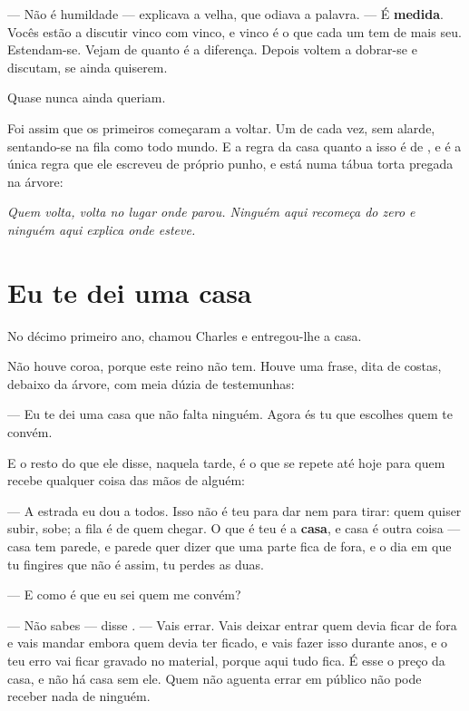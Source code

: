 \documentclass[livro.tex]{subfiles}
\begin{document}
--- Não é humildade --- explicava a velha, que odiava a palavra. --- É \textbf{medida}. Vocês
estão a discutir vinco com vinco, e vinco é o que cada um tem de mais seu. Estendam-se. Vejam de
quanto é a diferença. Depois voltem a dobrar-se e discutam, se ainda quiserem.

Quase nunca ainda queriam.

\medskip

Foi assim que os primeiros começaram a voltar. Um de cada vez, sem alarde, sentando-se na fila
como todo mundo. E a regra da casa quanto a isso é de \Ven , e é a única regra que ele escreveu
de próprio punho, e está numa tábua torta pregada na árvore:

\emph{Quem volta, volta no lugar onde parou. Ninguém aqui recomeça do zero e ninguém aqui
explica onde esteve.}

\section{Eu te dei uma casa}

No décimo primeiro ano, \Ven chamou Charles e entregou-lhe a casa.

Não houve coroa, porque este reino não tem. Houve uma frase, dita de costas, debaixo da árvore,
com meia dúzia de testemunhas:

--- Eu te dei uma casa que não falta ninguém. Agora és tu que escolhes quem te convém.

\medskip

E o resto do que ele disse, naquela tarde, é o que se repete até hoje para quem recebe qualquer
coisa das mãos de alguém:

--- A estrada eu dou a todos. Isso não é teu para dar nem para tirar: quem quiser subir, sobe; a
fila é de quem chegar. O que é teu é a \textbf{casa}, e casa é outra coisa --- casa tem parede, e
parede quer dizer que uma parte fica de fora, e o dia em que tu fingires que não é assim, tu
perdes as duas.

--- E como é que eu sei quem me convém?

--- Não sabes --- disse \Ven . --- Vais errar. Vais deixar entrar quem devia ficar de fora e vais
mandar embora quem devia ter ficado, e vais fazer isso durante anos, e o teu erro vai ficar
gravado no material, porque aqui tudo fica. É esse o preço da casa, e não há casa sem ele. Quem
não aguenta errar em público não pode receber nada de ninguém.
\end{document}
